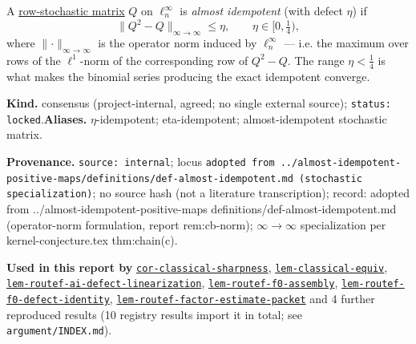 \hypertarget{def:almost-idempotent}{}%
\begin{definition}\label{def:almost-idempotent}
A \hyperref[def:stochastic]{row-stochastic matrix} $Q$
on $\ell^\infty_n$ is \emph{almost idempotent} (with defect $\eta$) if
\[\lVert Q^2-Q\rVert_{\infty\to\infty}\le\eta,\qquad \eta\in[0,\tfrac14),\]
where $\lVert\cdot\rVert_{\infty\to\infty}$ is the operator norm induced by $\ell^\infty_n$ --- i.e. the
maximum over rows of the $\ell^1$-norm of the corresponding row of $Q^2-Q$. The range $\eta<\tfrac14$ is
what makes the binomial series producing the exact idempotent converge.
\end{definition}
\begin{defnote}
\textbf{Kind.} consensus (project-internal, agreed; no single external source); \texttt{status: locked}.\quad\textbf{Aliases.} $\eta$-idempotent; eta-idempotent; almost-idempotent stochastic matrix.
\par
\textbf{Provenance.} \texttt{source: internal}; locus \texttt{adopted from ..\allowbreak{}/\allowbreak{}almost-\allowbreak{}idempotent-\allowbreak{}positive-\allowbreak{}maps/\allowbreak{}definitions/\allowbreak{}def-\allowbreak{}almost-\allowbreak{}idempotent.\allowbreak{}md (stochastic specialization)}; no source hash (not a literature transcription); record: adopted from ..\allowbreak{}/\allowbreak{}almost-\allowbreak{}idempotent-\allowbreak{}positive-\allowbreak{}maps definitions/\allowbreak{}def-\allowbreak{}almost-\allowbreak{}idempotent.\allowbreak{}md (operator-\allowbreak{}norm formulation,\allowbreak{} report rem:\allowbreak{}cb-\allowbreak{}norm);\allowbreak{} \textnormal{$\infty\to\infty$} specialization per kernel-\allowbreak{}conjecture.\allowbreak{}tex thm:\allowbreak{}chain(c).
\par
\textbf{Used in this report by} \hyperref[cor:classical-sharpness]{\texttt{cor-\allowbreak{}classical-\allowbreak{}sharpness}}, \hyperref[lem:classical-equiv]{\texttt{lem-\allowbreak{}classical-\allowbreak{}equiv}}, \hyperref[lem:routef-ai-defect-linearization]{\texttt{lem-\allowbreak{}routef-\allowbreak{}ai-\allowbreak{}defect-\allowbreak{}linearization}}, \hyperref[lem:routef-f0-assembly]{\texttt{lem-\allowbreak{}routef-\allowbreak{}f0-\allowbreak{}assembly}}, \hyperref[lem:routef-f0-defect-identity]{\texttt{lem-\allowbreak{}routef-\allowbreak{}f0-\allowbreak{}defect-\allowbreak{}identity}}, \hyperref[lem:routef-factor-estimate-packet]{\texttt{lem-\allowbreak{}routef-\allowbreak{}factor-\allowbreak{}estimate-\allowbreak{}packet}} and 4 further reproduced results (10 registry results import it in total; see \texttt{argument/INDEX.md}).

\end{defnote}
